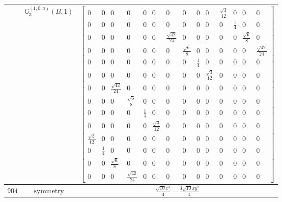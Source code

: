 \documentclass[fleqn,8pt,landscape]{jsarticle}
\begin{document}
\begin{longtable}{ccc}
$  $ & $ \mathbb{G}_{3}^{(1,0;a)}(B,1) $ & $ \begin{bmatrix} 0 & 0 & 0 & 0 & 0 & 0 & 0 & 0 & 0 & 0 & \frac{\sqrt{3}}{12} & 0 & 0 & 0 \\ 0 & 0 & 0 & 0 & 0 & 0 & 0 & 0 & 0 & 0 & 0 & \frac{1}{4} & 0 & 0 \\ 0 & 0 & 0 & 0 & 0 & 0 & \frac{\sqrt{42}}{24} & 0 & 0 & 0 & 0 & 0 & \frac{\sqrt{6}}{8} & 0 \\ 0 & 0 & 0 & 0 & 0 & 0 & 0 & \frac{\sqrt{6}}{8} & 0 & 0 & 0 & 0 & 0 & \frac{\sqrt{42}}{24} \\ 0 & 0 & 0 & 0 & 0 & 0 & 0 & 0 & \frac{1}{4} & 0 & 0 & 0 & 0 & 0 \\ 0 & 0 & 0 & 0 & 0 & 0 & 0 & 0 & 0 & \frac{\sqrt{3}}{12} & 0 & 0 & 0 & 0 \\ 0 & 0 & \frac{\sqrt{42}}{24} & 0 & 0 & 0 & 0 & 0 & 0 & 0 & 0 & 0 & 0 & 0 \\ 0 & 0 & 0 & \frac{\sqrt{6}}{8} & 0 & 0 & 0 & 0 & 0 & 0 & 0 & 0 & 0 & 0 \\ 0 & 0 & 0 & 0 & \frac{1}{4} & 0 & 0 & 0 & 0 & 0 & 0 & 0 & 0 & 0 \\ 0 & 0 & 0 & 0 & 0 & \frac{\sqrt{3}}{12} & 0 & 0 & 0 & 0 & 0 & 0 & 0 & 0 \\ \frac{\sqrt{3}}{12} & 0 & 0 & 0 & 0 & 0 & 0 & 0 & 0 & 0 & 0 & 0 & 0 & 0 \\ 0 & \frac{1}{4} & 0 & 0 & 0 & 0 & 0 & 0 & 0 & 0 & 0 & 0 & 0 & 0 \\ 0 & 0 & \frac{\sqrt{6}}{8} & 0 & 0 & 0 & 0 & 0 & 0 & 0 & 0 & 0 & 0 & 0 \\ 0 & 0 & 0 & \frac{\sqrt{42}}{24} & 0 & 0 & 0 & 0 & 0 & 0 & 0 & 0 & 0 & 0 \end{bmatrix} $ \\ \hline
$ 904 $ & $ \text{symmetry} $ & $ \frac{\sqrt{10} x^{3}}{4} - \frac{3 \sqrt{10} x y^{2}}{4} $ \\

\end{longtable}
\end{document}
